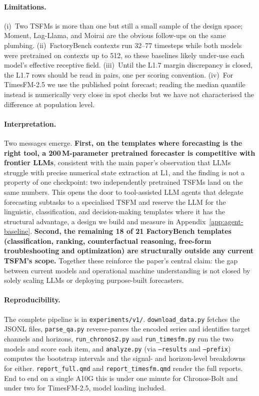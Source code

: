 \paragraph{Limitations.} (i)~Two TSFMs is more than one but still a small sample of the design space; Moment, Lag-Llama, and Moirai are the obvious follow-ups on the same plumbing. (ii)~FactoryBench contexts run 32--77 timesteps while both models were pretrained on contexts up to 512, so these baselines likely under-use each model's effective receptive field. (iii)~Until the L1.7 margin discrepancy is closed, the L1.7 rows should be read in pairs, one per scoring convention. (iv)~For TimesFM-2.5 we use the published point forecast; reading the median quantile instead is numerically very close in spot checks but we have not characterised the difference at population level.

\paragraph{Interpretation.} Two messages emerge. \textbf{First, on the templates where forecasting is the right tool, a 200\,M-parameter pretrained forecaster is competitive with frontier LLMs}, consistent with the main paper's observation that LLMs struggle with precise numerical state extraction at L1, and the finding is not a property of one checkpoint: two independently pretrained TSFMs land on the same numbers. This opens the door to tool-assisted LLM agents that delegate forecasting subtasks to a specialised TSFM and reserve the LLM for the linguistic, classification, and decision-making templates where it has the structural advantage, a design we build and measure in Appendix~\ref{app:agent-baseline}. \textbf{Second, the remaining 18 of 21 FactoryBench templates (classification, ranking, counterfactual reasoning, free-form troubleshooting and optimization) are structurally outside any current TSFM's scope.} Together these reinforce the paper's central claim: the gap between current models and operational machine understanding is not closed by solely scaling LLMs or deploying purpose-built forecasters.

\paragraph{Reproducibility.} The complete pipeline is in \texttt{experiments/v1/}. \texttt{download\_data.py} fetches the JSONL files, \texttt{parse\_qa.py} reverse-parses the encoded series and identifies target channels and horizons, \texttt{run\_chronos2.py} and \texttt{run\_timesfm.py} run the two models and score each item, and \texttt{analyze.py} (via \texttt{--results} and \texttt{--prefix}) computes the bootstrap intervals and the signal- and horizon-level breakdowns for either. \texttt{report\_full.qmd} and \texttt{report\_timesfm.qmd} render the full reports. End to end on a single A10G this is under one minute for Chronos-Bolt and under two for TimesFM-2.5, model loading included.



